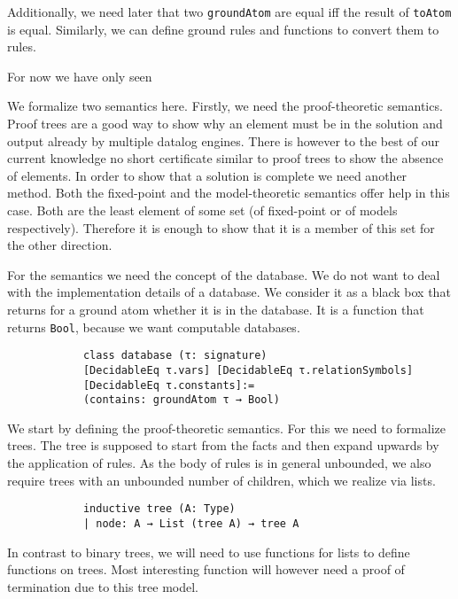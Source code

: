 \documentclass{article}
\begin{document}
        Additionally, we need later that two \texttt{groundAtom} are equal iff the result of \texttt{toAtom} is equal. Similarly, we can define ground rules and functions to convert them to rules.

        For now we have only seen 


        We formalize two semantics here. Firstly, we need the proof-theoretic semantics. Proof trees are a good way to show why an element must be in the solution and output already by multiple datalog engines. There is however to the best of our current knowledge no short certificate similar to proof trees to show the absence of elements. In order to show that a solution is complete we need another method. Both the fixed-point and the model-theoretic semantics offer help in this case. Both are the least element of some set (of fixed-point or of models respectively). Therefore it is enough to show that it is a member of this set for the other direction.

        For the semantics we need the concept of the database. We do not want to deal with the implementation details of a database. We consider it as a black box that returns for a ground atom whether it is in the database. It is a function that returns \texttt{Bool}, because we want computable databases.

        \begin{lstlisting}
            class database (τ: signature) 
            [DecidableEq τ.vars] [DecidableEq τ.relationSymbols]
            [DecidableEq τ.constants]:=
            (contains: groundAtom τ → Bool)
        \end{lstlisting}
        

        We start by defining the proof-theoretic semantics. For this we need to formalize trees. The tree is supposed to start from the facts and then expand upwards by the application of rules. As the body of rules is in general unbounded, we also require trees with an unbounded number of children, which we realize via lists.

        \begin{lstlisting}
            inductive tree (A: Type)
            | node: A → List (tree A) → tree A        
        \end{lstlisting}

        In contrast to binary trees, we will need to use functions for lists to define functions on trees. Most interesting function will however need a proof of termination due to this tree model. 
        
\end{document}
